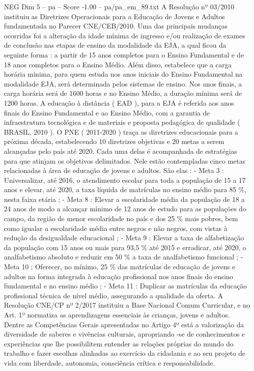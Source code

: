 \begin{textsample}{NEG Dim 5 – pa – Score -1.00 – pa/pa\_em\_89.txt}
A Resolução nº 03/2010 instituiu as Diretrizes Operacionais para a Educação de Jovens e Adultos fundamentada no Parecer CNE/CEB/2010.
Uma das principais mudanças ocorridas foi a alteração da idade mínima de ingresso e/ou realização de exames de conclusão nas etapas de ensino da modalidade da EJA, a qual ficou da seguinte forma : a partir de 15 anos completos para o Ensino Fundamental e de 18 anos completos para o Ensino Médio.
Além disso, estabelece que a carga horária mínima, para quem estuda nos anos iniciais do Ensino Fundamental na modalidade EJA, será determinada pelos sistemas de ensino.
Nos anos finais, a carga horária será de 1600 horas e no Ensino Médio, a duração mínima será de 1200 horas.
A educação à distância ( EAD ), para a EJA é referida aos anos finais do Ensino Fundamental e ao Ensino Médio, com a garantia de infraestrutura tecnológica e de materiais e proposta pedagógica de qualidade ( BRASIL, 2010 ).
O PNE ( 2011-2020 ) traça as diretrizes educacionais para a próxima década, estabelecendo 10 diretrizes objetivas e 20 metas a serem alcançadas pelo país até 2020.
Cada uma delas é acompanhada de estratégias para que atinjam os objetivos delimitados.
Nele estão contempladas cinco metas relacionadas à área de educação de jovens e adultos.
São elas : - Meta 3 : Universalizar, até 2016, o atendimento escolar para toda a população de 15 a 17 anos e elevar, até 2020, a taxa líquida de matrículas no ensino médio para 85 \%, nesta faixa etária ; - Meta 8 : Elevar a escolaridade média da população de 18 a 24 anos de modo a alcançar mínimo de 12 anos de estudo para as populações do campo, da região de menor escolaridade no país e dos 25 \% mais pobres, bem como igualar a escolaridade média entre negros e não negros, com vistas à redução da desigualdade educacional ; - Meta 9 : Elevar a taxa de alfabetização da população com 15 anos ou mais para 93,5 \% até 2015 e erradicar, até 2020, o analfabetismo absoluto e reduzir em 50 \% a taxa de analfabetismo funcional ; - Meta 10 : Oferecer, no mínimo, 25 \% das matrículas de educação de jovens e adultos na forma integrada à educação profissional nos anos finais do ensino fundamental e no ensino médio ; - Meta 11 : Duplicar as matrículas da educação profissional técnica de nível médio, assegurando a qualidade da oferta.
A Resolução CNE/CP nº 2/2017 instituiu a Base Nacional Comum Curricular, e no Art. 1º normatiza as aprendizagens essenciais às crianças, jovens e adultos.
Dentre as Competências Gerais apresentadas no Artigo 4º está a valorização da diversidade de saberes e vivências culturais, apropriando -se de conhecimentos e experiências que lhe possibilitem entender as relações próprias do mundo do trabalho e fazer escolhas alinhadas ao exercício da cidadania e ao seu projeto de vida com liberdade, autonomia, consciência crítica e responsabilidade.

\end{textsample}
